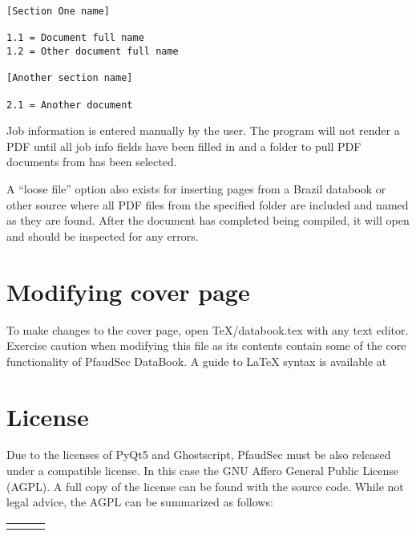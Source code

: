 \documentclass[14pt]{article}
\newcommand{\chref}[3][black]{\href{#2}{\color{#1}{#3}}}%
\begin{document}
\begin{flushleft}
\begin{tcolorbox}[
coltitle=black, title=\centering Example sections\_config.ini,
boxrule=0.5pt, colback=backgrey, colframe=bordergrey, sharpish corners]
\begin{verbatim}
[Section One name]

1.1 = Document full name
1.2 = Other document full name

[Another section name]

2.1 = Another document

\end{verbatim}
\end{tcolorbox}

\noindent Job information is entered manually by the user. The program will not render a PDF until all job info fields have been filled in and a folder to pull PDF documents from has been selected.

A ``loose file'' option also exists for inserting pages from a Brazil databook or other source where all PDF files from the specified folder are included and named as they are found.
After the document has completed being compiled, it will open and should be inspected for any errors.
\setlength{\parindent}{0in}

\section{Modifying cover page}

To make changes to the cover page, open TeX/databook.tex with any text editor.
Exercise caution when modifying this file as its contents contain some of the core functionality of PfaudSec DataBook.
A guide to \LaTeX\xspace syntax is available at 
\chref[pfblue]
{https://en.wikibooks.org/wiki/LaTeX/Basics}
{https://en.wikibooks.org/wiki/LaTeX/Basics}

\section{License}

Due to the licenses of PyQt5 and Ghostscript, PfaudSec must be also released under a compatible license.
In this case the GNU Affero General Public License (AGPL).
A full copy of the license can be found with the source code.
While not legal advice, the AGPL can be summarized as follows:\\[\normalbaselineskip]

\def\tabularxcolumn#1{m{#1}}%
\begin{tabularx}{\textwidth}{YYY}

\begin{tcolorbox}[
	equal height group=license, coltitle=black, title=\centering Must,
	boxrule=0.5pt, colback=backgrey, colframe=bordergrey, sharpish corners] 
\begin{itemize}[leftmargin=*]


\end{itemize}
\end{tcolorbox}
\end{tabularx}
\end{flushleft}
\end{document}
